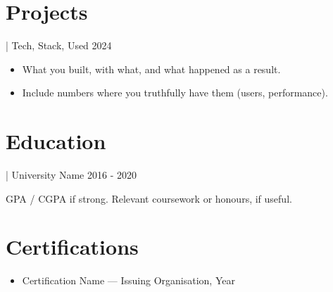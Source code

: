\documentclass[11pt]{article}
\newcommand{\job}[4]{%
  \vspace{4pt}{\bfseries #1} | #2#3 \hfill #4\par}
\begin{document}
\section{Projects}

\job{Project Name}{Tech, Stack, Used}{}{2024}
\begin{itemize}
  \item What you built, with what, and what happened as a result.
  \item Include numbers where you truthfully have them (users, performance).
\end{itemize}

\section{Education}
\job{Degree, Field of Study}{University Name}{}{2016 - 2020}
GPA / CGPA if strong. Relevant coursework or honours, if useful.


\section{Certifications}
\begin{itemize}
  \item Certification Name — Issuing Organisation, Year
\end{itemize}
\end{document}
